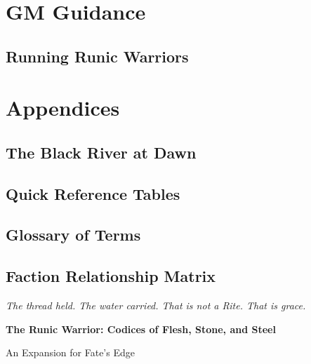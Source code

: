 \documentclass[11pt,letterpaper]{book}
\newcommand{\cfile}[1]{}
\begin{document}
\part{GM Guidance}

\chapter{Running Runic Warriors}
\cfile{gm/01_npcs}
\cfile{gm/02_faction_politics}
\cfile{gm/03_designing_custom_thiasos}
\cfile{gm/04_obligation_as_physical_scar}
\cfile{gm/05_sample_npcs_by_family}

\part{Appendices}

\appendix

\chapter{The Black River at Dawn}
\cfile{appendices/01_black_river_at_dawn}

\chapter{Quick Reference Tables}
\cfile{appendices/02_table_patrons_by_archetype}
\cfile{appendices/03_table_patrons_by_culture}
\cfile{appendices/04_table_talents_by_tier}
\cfile{appendices/05_table_rites_by_patron_and_tier}
\cfile{appendices/06_table_thiasos_by_patron}
\cfile{appendices/07_table_codex_by_patron}
\cfile{appendices/08_table_sentient_thiasos_by_patron}

\chapter{Glossary of Terms}
\cfile{appendices/09_glossary}

\chapter{Faction Relationship Matrix}
\cfile{appendices/10_faction_matrix}

\newpage
\thispagestyle{empty}
\vspace*{\fill}
\begin{center}
\textit{The thread held. The water carried. That is not a Rite. That is grace.}

\vspace{2em}

\textbf{The Runic Warrior: Codices of Flesh, Stone, and Steel}

\vspace{1em}
An Expansion for Fate's Edge
\end{center}
\vspace*{\fill}
\end{document}
